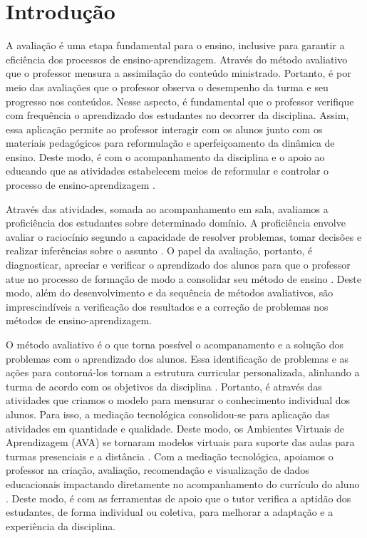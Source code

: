 \chapter{Introdução}
\label{cap1-intro}

A avaliação é uma etapa fundamental para o ensino, inclusive para garantir a eficiência dos processos de ensino-aprendizagem. Através do método avaliativo que o professor mensura a assimilação do conteúdo ministrado. Portanto, é por meio das avaliações que o professor observa o desempenho da turma e seu progresso nos conteúdos. Nesse aspecto, é fundamental que o professor verifique com frequência o aprendizado dos estudantes no decorrer da disciplina. Assim, essa aplicação permite ao professor interagir com os alunos junto com os materiais pedagógicos para reformulação e aperfeiçoamento da dinâmica de ensino. Deste modo, é com o acompanhamento da disciplina e o apoio ao educando que as atividades estabelecem meios de reformular e controlar o processo de ensino-aprendizagem \cite{barreira2006}.

Através das atividades, somada ao acompanhamento em sala, avaliamos a proficiência dos estudantes sobre determinado domínio. A proficiência envolve avaliar o raciocínio segundo a capacidade de resolver problemas, tomar decisões e realizar inferências sobre o assunto \cite{casiraghi2017}. O papel da avaliação, portanto, é diagnosticar, apreciar e verificar o aprendizado dos alunos para que o professor atue no processo de formação de modo a consolidar seu método de ensino \cite{oliveira2005}. Deste modo, além do desenvolvimento e da sequência de métodos avaliativos, são imprescindíveis a verificação dos resultados e a correção de problemas nos métodos de ensino-aprendizagem.

O método avaliativo é o que torna possível o acompanamento e a solução dos problemas com o aprendizado dos alunos. Essa identificação de problemas e as ações para contorná-los tornam a estrutura curricular personalizada, alinhando a turma de acordo com os objetivos da disciplina \cite{biggs1998}. Portanto, é através das atividades que criamos o modelo para mensurar o conhecimento individual dos alunos. Para isso, a mediação tecnológica consolidou-se para aplicação das atividades em quantidade e qualidade. Deste modo, os Ambientes Virtuais de Aprendizagem (AVA) \cite{maquine2020} se tornaram modelos virtuais para suporte das aulas para turmas presenciais e a distância \cite{raes2020}. Com a mediação tecnológica, apoiamos o professor na criação, avaliação, recomendação e visualização de dados educacionais impactando diretamente no acompanhamento do currículo do aluno \cite{paiva2012}. Deste modo, é com as ferramentas de apoio que o tutor verifica a aptidão dos estudantes, de forma individual ou coletiva, para melhorar a adaptação e a experiência da disciplina.

